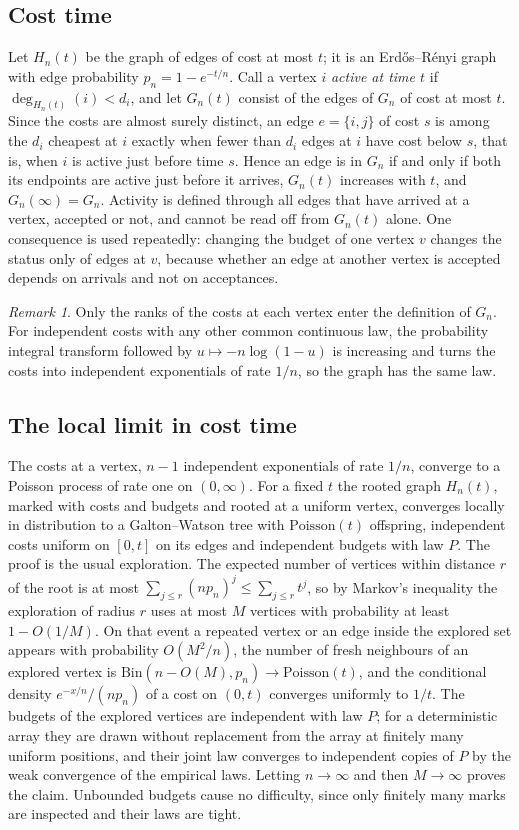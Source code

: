 \documentclass[11pt]{amsart}
\theoremstyle{remark}
\newtheorem{remark}[theorem]{Remark}
\numberwithin{equation}{section}
\newcommand{\1}{\mathbf 1}
\begin{document}
\subsection{Cost time}
Let $H_n(t)$ be the graph of edges of cost at most $t$; it is an Erd\H{o}s--R\'enyi graph with edge probability $p_n=1-e^{-t/n}$. Call a vertex $i$ \emph{active at time $t$} if $\deg_{H_n(t)}(i)<d_i$, and let $G_n(t)$ consist of the edges of $G_n$ of cost at most $t$. Since the costs are almost surely distinct, an edge $e=\{i,j\}$ of cost $s$ is among the $d_i$ cheapest at $i$ exactly when fewer than $d_i$ edges at $i$ have cost below $s$, that is, when $i$ is active just before time $s$. Hence an edge is in $G_n$ if and only if both its endpoints are active just before it arrives, $G_n(t)$ increases with $t$, and $G_n(\infty)=G_n$. Activity is defined through all edges that have arrived at a vertex, accepted or not, and cannot be read off from $G_n(t)$ alone. One consequence is used repeatedly: changing the budget of one vertex $v$ changes the status only of edges at $v$, because whether an edge at another vertex is accepted depends on arrivals and not on acceptances.

\begin{remark}\label{rem:costs}
Only the ranks of the costs at each vertex enter the definition of $G_n$. For independent costs with any other common continuous law, the probability integral transform followed by $u\mapsto-n\log(1-u)$ is increasing and turns the costs into independent exponentials of rate $1/n$, so the graph has the same law.
\end{remark}

\subsection{The local limit in cost time}
The costs at a vertex, $n-1$ independent exponentials of rate $1/n$, converge to a Poisson process of rate one on $(0,\infty)$. For a fixed $t$ the rooted graph $H_n(t)$, marked with costs and budgets and rooted at a uniform vertex, converges locally in distribution to a Galton--Watson tree with $\mathrm{Poisson}(t)$ offspring, independent costs uniform on $[0,t]$ on its edges and independent budgets with law $P$. The proof is the usual exploration. The expected number of vertices within distance $r$ of the root is at most $\sum_{j\le r}(np_n)^j\le\sum_{j\le r}t^j$, so by Markov's inequality the exploration of radius $r$ uses at most $M$ vertices with probability at least $1-O(1/M)$. On that event a repeated vertex or an edge inside the explored set appears with probability $O(M^2/n)$, the number of fresh neighbours of an explored vertex is $\mathrm{Bin}(n-O(M),p_n)\to\mathrm{Poisson}(t)$, and the conditional density $e^{-x/n}/(np_n)$ of a cost on $(0,t)$ converges uniformly to $1/t$. The budgets of the explored vertices are independent with law $P$; for a deterministic array they are drawn without replacement from the array at finitely many uniform positions, and their joint law converges to independent copies of $P$ by the weak convergence of the empirical laws. Letting $n\to\infty$ and then $M\to\infty$ proves the claim. Unbounded budgets cause no difficulty, since only finitely many marks are inspected and their laws are tight.
\end{document}
